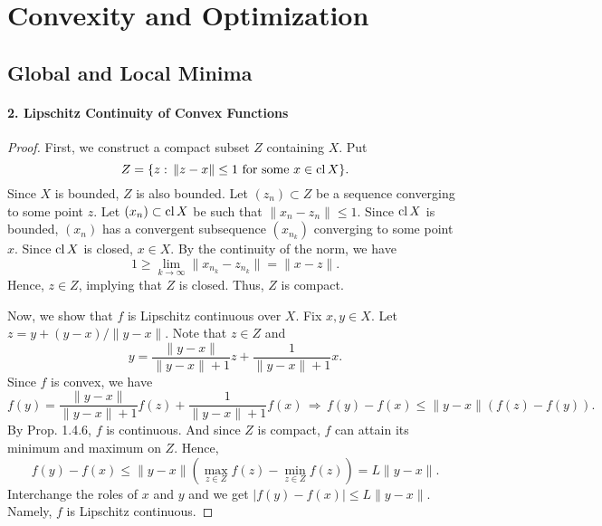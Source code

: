 \section{Convexity and Optimization}
\subsection{Global and Local Minima}
  \paragraph{2. Lipschitz Continuity of Convex Functions}
  \begin{proof}
    First, we construct a compact subset $Z$ containing $X$. Put 
    \[
      Z=\{z:\,\|z-x\|\le 1\text{ for some $x\in \operatorname{cl} X$} \}.
    \]
    Since $X$ is bounded, $Z$ is also bounded. Let $(z_n)\subset Z$ be a 
    sequence converging to some point $z$. Let $(x_n)\subset\operatorname{cl} X$ be such that
    $\|x_n-z_n\|\le 1$. Since $\operatorname{cl} X$ is bounded, $(x_n)$ has a convergent 
    subsequence $(x_{n_k})$ converging to some point $x$. Since $\operatorname{cl} X$ is 
    closed, $x\in X$. By the continuity of the norm, we have
    \[
      1\ge\lim_{k\to\infty}\|x_{n_k}-z_{n_k}\|=\|x-z\|.
    \]
    Hence, $z\in Z$, implying that $Z$ is closed. Thus, $Z$ is compact.\par
    Now, we show that $f$ is Lipschitz continuous over $X$. Fix $x,y\in X$.
    Let $z=y+(y-x)/\|y-x\|$. Note that $z\in Z$ and
    \[
      y=\frac{\|y-x\|}{\|y-x\|+1}z+\frac{1}{\|y-x\|+1}x.
    \]
    Since $f$ is convex, we have
    \[
      f(y)=\frac{\|y-x\|}{\|y-x\|+1}f(z)+\frac{1}{\|y-x\|+1}f(x)
      \,\Rightarrow\,
      f(y)-f(x)\le\|y-x\| (f(z)-f(y)).
    \]
    By Prop. 1.4.6, $f$ is continuous. And since $Z$ is compact, $f$ can 
    attain its minimum and maximum on $Z$. Hence,
    \[
      f(y)-f(x) \le \|y-x\|\left(\max_{z\in Z}f(z)-\min_{z\in Z}f(z)\right)
      =L\|y-x\|.
    \]
    Interchange the roles of $x$ and $y$ and we get $|f(y)-f(x)|\le L\|y-x\|$.
    Namely, $f$ is Lipschitz continuous.
  \end{proof}
  

